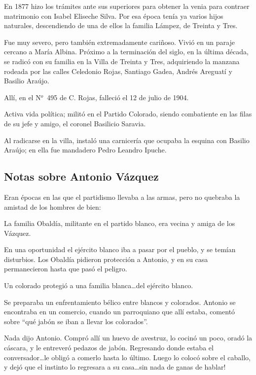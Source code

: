 \documentclass[a4paper]{article}
\begin{document}
\bigbreak{}

En 1877 hizo los trámites ante sus superiores para obtener la venia para contraer matrimonio con Isabel Eliseche Silva. Por esa época tenía ya varios hijos naturales, descendiendo de una de ellos la familia Lámpez, de Treinta y Tres.

Fue muy severo, pero también extremadamente cariñoso. Vivió en un paraje cercano a María Albina. Próximo a la terminación del siglo, en la última década, se radicó con su familia en la Villa de Treinta y Tres, adquiriendo la manzana rodeada por las calles Celedonio Rojas, Santiago Gadea, Andrés Areguatí y Basilio Araújo.

Allí, en el N$^o$~495 de C. Rojas, falleció el 12 de julio de 1904.

Activa vida política; militó en el Partido Colorado, siendo combatiente en las filas de su jefe y amigo, el coronel Basilicio Saravia.

Al radicarse en la villa, instaló una carnicería que ocupaba la esquina con Basilio Araújo; en ella fue mandadero Pedro Leandro Ipuche.

\subsection{Notas sobre Antonio Vázquez}

Eran épocas en las que el partidismo llevaba a las armas, pero no quebraba la amistad de los hombres de bien:

La familia Obaldía, militante en el partido blanco, era vecina y amiga de los Vázquez.

En una oportunidad el ejército blanco iba a pasar por el pueblo, y se temían disturbios. Los Obaldía pidieron protección a Antonio, y en su casa permanecieron hasta que pasó el peligro.


Un colorado protegió a una familia blanca\ldots del ejército blanco.

\bigbreak{}

Se preparaba un enfrentamiento bélico entre blancos y colorados. Antonio se encontraba en un comercio, cuando un parroquiano que allí estaba, comentó sobre ``qué jabón se iban a llevar los colorados''.

Nada dijo Antonio. Compró allí un huevo de avestruz, lo cocinó un poco, oradó la cáscara, y le entreveró pedazos de jabón. Regresando donde estaba el conversador\ldots le obligó a comerlo hasta lo último. Luego lo colocó sobre el caballo, y dejó que el instinto lo regresara a su casa\ldots sin nada de ganas de hablar!
\end{document}

